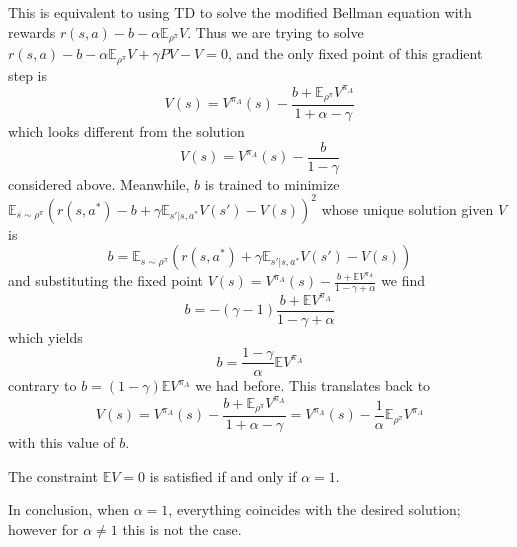 \documentclass[11pt]{article}
\newcommand{\E}{\mathbb{E}}
\begin{document}
This is equivalent to using TD
to solve the modified Bellman equation with
rewards $r(s,a)-b-\alpha \E_{\rho^\pi}V$. Thus we are trying to solve
$r(s,a)-b-\alpha \E_{\rho^\pi}V+\gamma PV-V=0$, and the only fixed point
of this gradient step is
\begin{equation}
V(s)=V^{\pi_A}(s)-\frac{b+\E_{\rho^\pi} V^{\pi_A}}{1+\alpha-\gamma}
\end{equation}
which looks different from the solution
\begin{equation}
V(s)=V^{\pi_A}(s)-\frac{b}{1-\gamma}
\end{equation}
considered above.
Meanwhile, $b$ is trained to minimize $\E_{s\sim \rho^\pi}
(r(s,a^\ast)-b+\gamma \E_{s'|s,a^\ast}V(s')-V(s))^2$ whose unique
solution given $V$ is
\begin{equation}
b=\E_{s\sim \rho^\pi}(r(s,a^\ast)+\gamma \E_{s'|s,a^\ast}V(s')-V(s))
\end{equation}
and substituting the fixed point
$V(s)=V^{\pi_A}(s)-\frac{b+\E V^{\pi_A}}{1-\gamma+\alpha}$ we find
\begin{equation}
b=-(\gamma-1) \frac{b+\E V^{\pi_A}}{1-\gamma+\alpha}
\end{equation}
which yields
\begin{equation}
b=\frac{1-\gamma}{\alpha} \E V^{\pi_A}
\end{equation}
contrary to $b=(1-\gamma)\E V^{\pi_A}$ we had before. 
This translates back to
\begin{equation}
V(s)=V^{\pi_A}(s)-\frac{b+\E_{\rho^\pi} V^{\pi_A}}{1+\alpha-\gamma}
=V^{\pi_A}(s)-\frac1\alpha \E_{\rho^\pi} V^{\pi_A}
\end{equation}
with this value of $b$.

The constraint $\E V=0$ is satisfied if and only if $\alpha=1$.

In conclusion, when $\alpha=1$, everything coincides with the desired
solution; however for $\alpha\neq 1$ this is not the case.
\end{document}

